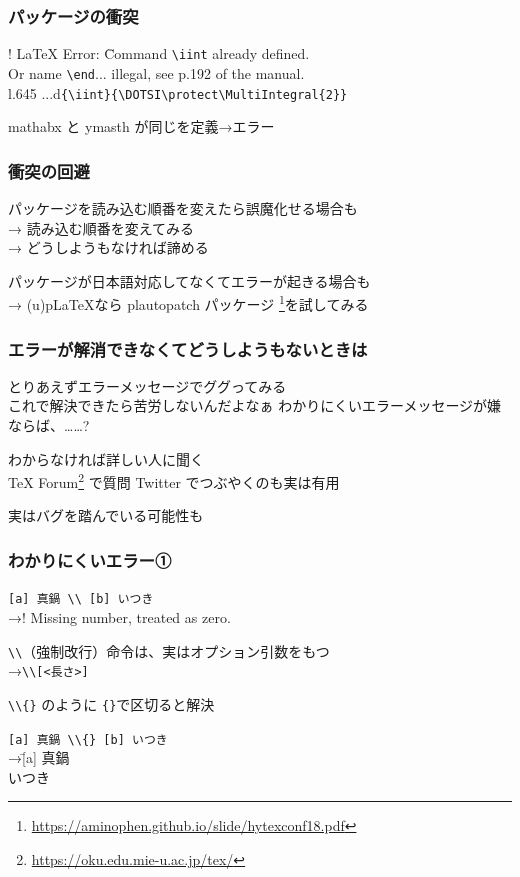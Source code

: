 \begin{frame}[fragile]
	\frametitle{パッケージの衝突}
	
	\vspace{-1ex}\vspace{-1ex}
	\bgroup\errorfont\scriptsize
	\begin{tabbing}
		! LaTeX Error: \=Command \verb+\iint+ already defined.\\
		\>Or name \verb+\end+... illegal, see p.192 of the manual.\\
		l.645 ...d\verb+{\iint}{\DOTSI\protect\MultiIntegral{2}}+\\
	\end{tabbing}
	\egroup
	\pause
	mathabx と ymasth が同じを定義→エラー
\end{frame}

\begin{frame}
	\frametitle{衝突の回避}
	パッケージを読み込む順番を変えたら誤魔化せる場合も\\
	→ 読み込む順番を変えてみる\\
	→ どうしようもなければ諦める

	パッケージが日本語対応してなくてエラーが起きる場合も\\
	→ (u)p\LaTeX なら plautopatch パッケージ
	\footnote{\url{https://aminophen.github.io/slide/hytexconf18.pdf}}を試してみる
\end{frame}

\begin{frame}
	\frametitle{エラーが解消できなくてどうしようもないときは}
	とりあえずエラーメッセージでググってみる\\
	{\tiny これで解決できたら苦労しないんだよなぁ わかりにくいエラーメッセージが嫌ならば、\SATySFi ……?}

	わからなければ詳しい人に聞く\\
	{\footnotesize TeX Forum\footnote{\url{https://oku.edu.mie-u.ac.jp/tex/}} で質問 Twitter でつぶやくのも実は有用}

	実はバグを踏んでいる可能性も
\end{frame}

\begin{frame}[fragile]
	\frametitle{わかりにくいエラー①}

	\verb+[a] 真鍋 \\ [b] いつき+\\
	→{\errorfont ! Missing number, treated as zero.}

	\verb+\\+（強制改行）命令は、実はオプション引数をもつ\\
	\hspace*{1em}→\verb+\\[<長さ>]+

	\verb+\\{}+ のように \verb+{}+で区切ると解決

	\bgroup\footnotesize
	\begin{tabbing}
		\verb+[a] 真鍋 \\{} [b] いつき+\\
		→\=[a] 真鍋 \\{} \> [b] いつき
	\end{tabbing}
	\egroup
\end{frame}

